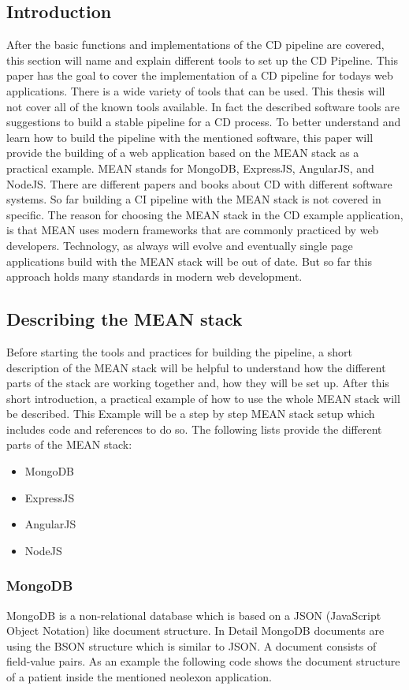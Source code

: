 \subsection{Introduction}
After the basic functions and implementations of the CD pipeline are covered, this section will name and explain different tools
to set up the CD Pipeline. This paper has the goal to cover the implementation of a CD pipeline for todays web applications. There is a wide variety
of tools that can be used. This thesis will not cover all of the known tools available. In fact the described software tools are suggestions to build a
stable pipeline for a CD process. To better understand and learn how to build the pipeline with the mentioned software, this paper will provide the building
of a web application based on the MEAN stack as a practical example. MEAN stands for MongoDB, ExpressJS, AngularJS, and NodeJS. There are different papers and
books about CD with different software systems. So far building a CI pipeline with the MEAN stack is not covered in specific.
The reason for choosing the MEAN stack in the CD example application, is that MEAN uses modern frameworks that are commonly practiced by web developers.
Technology, as always will evolve and eventually single page applications build with the MEAN stack will be out of date. But so far this approach holds many
standards in modern web development.

\subsection{Describing the MEAN stack}
Before starting the tools and practices for building the pipeline, a short description of the MEAN stack will be helpful to understand how the different parts of the
stack are working together and, how they will be set up. After this short introduction, a practical example of how to use the whole MEAN stack will be described.
This Example will be a step by step MEAN stack setup which includes code and references to do so. The following lists provide the different parts of the MEAN stack:

\begin{itemize}
  \item MongoDB
  \item ExpressJS
  \item AngularJS
  \item NodeJS
\end{itemize}

\subsubsection{MongoDB}
MongoDB is a non-relational database which is based on a JSON (JavaScript Object Notation) like document structure. In Detail MongoDB documents are using the BSON structure
which is similar to JSON. A document consists of field-value pairs. As an example the following code shows the document structure of a patient inside the mentioned neolexon application.

